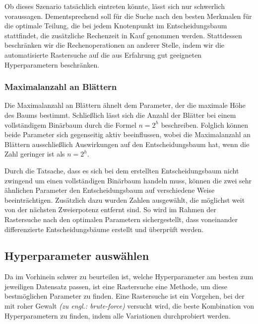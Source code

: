 \documentclass[12pt, a4paper]{article}
\begin{document}
Ob dieses Szenario tatsächlich eintreten könnte, lässt sich nur schwerlich voraussagen. Dementsprechend soll für die Suche nach den besten Merkmalen für die optimale Teilung, die bei jedem Knotenpunkt im Entscheidungsbaum stattfindet, die zusätzliche Rechenzeit in Kauf genommen werden. Stattdessen beschränken wir die Rechenoperationen an anderer Stelle, indem wir die automatisierte Rastersuche auf die aus Erfahrung gut geeigneten Hyperparametern beschränken.

\subsubsection{Maximalanzahl an Blättern}

Die Maximalanzahl an Blättern ähnelt dem Parameter, der die maximale Höhe des Baums bestimmt. Schließlich lässt sich die Anzahl der Blätter bei einem vollständigem Binärbaum durch die Formel $n=2^h$ beschreiben. Folglich können beide Parameter sich gegenseitig aktiv beeinflussen, wobei die Maximalanzahl an Blättern ausschließlich Auswirkungen auf den Entscheidungsbaum hat, wenn die Zahl geringer ist als $n=2^h$.

Durch die Tatsache, dass es sich bei dem erstellten Entscheidungsbaum nicht zwingend um einen vollständigen Binärbaum handeln muss, können die zwei sehr ähnlichen Parameter den Entscheidungsbaum auf verschiedene Weise beeinträchtigen.
Zusätzlich dazu wurden Zahlen ausgewählt, die möglichst weit von der nächsten Zweierpotenz entfernt sind. So wird im Rahmen der Rastersuche nach den optimalen Parametern sichergestellt, dass voneinander differenzierte Entscheidungsbäume erstellt und überprüft werden.

%

\subsection{Hyperparameter auswählen}

Da im Vorhinein schwer zu beurteilen ist, welche Hyperparameter am besten zum jeweiligen Datensatz passen, ist eine Rastersuche eine Methode, um diese bestmöglichen Parameter zu finden. Eine Rastersuche ist ein Vorgehen, bei der mit roher Gewalt \textit{(zu engl.: brute-force)} versucht wird, die beste Kombination von Hyperparametern zu finden, indem alle Variationen durchprobiert werden.
\end{document}
